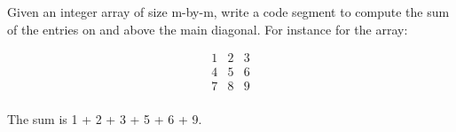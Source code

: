 \begin{ex}
Given an integer array of size m-by-m, write a code segment to compute the sum of the entries on and above the main diagonal. For instance for the array:

\begin{align*}
1 & 2 & 3 \\
4 & 5 & 6 \\
7 & 8 & 9 \\
\end{align*}

The sum is 1 + 2 + 3 + 5 + 6 + 9.
\end{ex}
